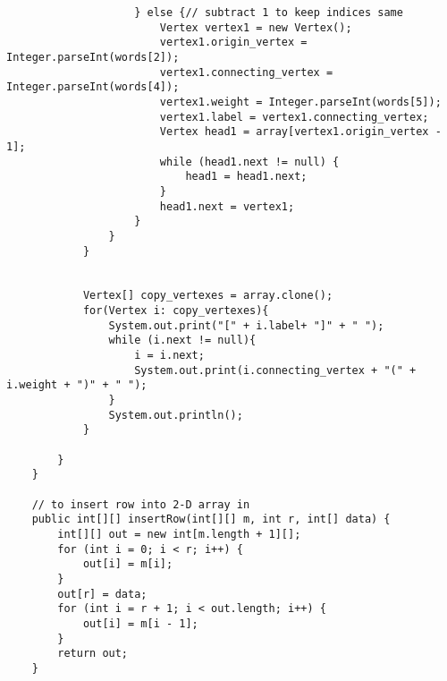 \documentclass{article}
\begin{document}
\begin{lstlisting}
                    } else {// subtract 1 to keep indices same
                        Vertex vertex1 = new Vertex();
                        vertex1.origin_vertex = Integer.parseInt(words[2]);
                        vertex1.connecting_vertex = Integer.parseInt(words[4]);
                        vertex1.weight = Integer.parseInt(words[5]);
                        vertex1.label = vertex1.connecting_vertex;
                        Vertex head1 = array[vertex1.origin_vertex - 1];
                        while (head1.next != null) {
                            head1 = head1.next;
                        }
                        head1.next = vertex1;
                    }
                }
            }


            Vertex[] copy_vertexes = array.clone();
            for(Vertex i: copy_vertexes){
                System.out.print("[" + i.label+ "]" + " ");
                while (i.next != null){
                    i = i.next;
                    System.out.print(i.connecting_vertex + "(" + i.weight + ")" + " ");
                }
                System.out.println();
            }

        }
    }

    // to insert row into 2-D array in
    public int[][] insertRow(int[][] m, int r, int[] data) {
        int[][] out = new int[m.length + 1][];
        for (int i = 0; i < r; i++) {
            out[i] = m[i];
        }
        out[r] = data;
        for (int i = r + 1; i < out.length; i++) {
            out[i] = m[i - 1];
        }
        return out;
    }


\end{lstlisting}
\end{document}
